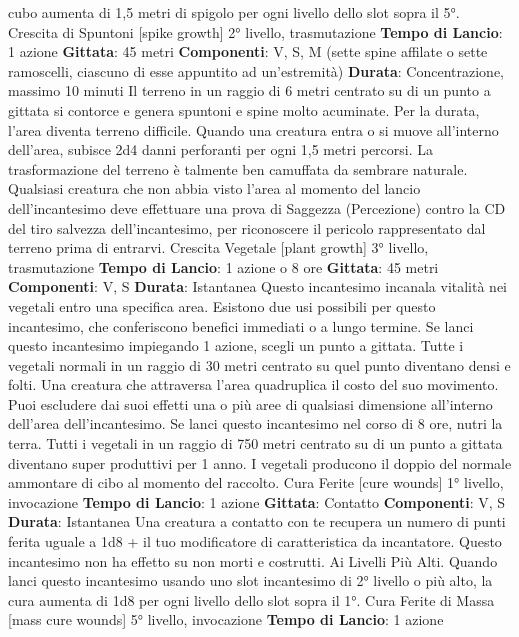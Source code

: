 \begin{multicols}{2}
cubo aumenta di 1,5 metri di spigolo per ogni livello
dello slot sopra il 5°.
Crescita di Spuntoni
[spike growth]
2° livello, trasmutazione
\textbf{Tempo di Lancio}: 1 azione
\textbf{Gittata}: 45 metri
\textbf{Componenti}: V, S, M (sette spine affilate o sette
ramoscelli, ciascuno di esse appuntito ad un’estremità)
\textbf{Durata}: Concentrazione, massimo 10 minuti
Il terreno in un raggio di 6 metri centrato su di un punto
a gittata si contorce e genera spuntoni e spine molto
acuminate. Per la durata, l’area diventa terreno difficile.
Quando una creatura entra o si muove all’interno
dell’area, subisce 2d4 danni perforanti per ogni 1,5
metri percorsi.
La trasformazione del terreno è talmente ben camuffata
da sembrare naturale. Qualsiasi creatura che non abbia
visto l’area al momento del lancio dell’incantesimo deve
effettuare una prova di Saggezza (Percezione) contro la
CD del tiro salvezza dell’incantesimo, per riconoscere il
pericolo rappresentato dal terreno prima di entrarvi.
Crescita Vegetale
[plant growth]
3° livello, trasmutazione
\textbf{Tempo di Lancio}: 1 azione o 8 ore
\textbf{Gittata}: 45 metri
\textbf{Componenti}: V, S
\textbf{Durata}: Istantanea
Questo incantesimo incanala vitalità nei vegetali entro
una specifica area. Esistono due usi possibili per
questo incantesimo, che conferiscono benefici
immediati o a lungo termine.
Se lanci questo incantesimo impiegando 1 azione,
scegli un punto a gittata. Tutte i vegetali normali in un 
raggio di 30 metri centrato su quel punto diventano
densi e folti. Una creatura che attraversa l’area
quadruplica il costo del suo movimento.
Puoi escludere dai suoi effetti una o più aree di
qualsiasi dimensione all’interno dell’area
dell’incantesimo.
Se lanci questo incantesimo nel corso di 8 ore, nutri la
terra. Tutti i vegetali in un raggio di 750 metri centrato
su di un punto a gittata diventano super produttivi per 1
anno. I vegetali producono il doppio del normale
ammontare di cibo al momento del raccolto.
Cura Ferite
[cure wounds]
1° livello, invocazione
\textbf{Tempo di Lancio}: 1 azione
\textbf{Gittata}: Contatto
\textbf{Componenti}: V, S
\textbf{Durata}: Istantanea
Una creatura a contatto con te recupera un numero di
punti ferita uguale a 1d8 + il tuo modificatore di
caratteristica da incantatore. Questo incantesimo non
ha effetto su non morti e costrutti.
Ai Livelli Più Alti. Quando lanci questo incantesimo
usando uno slot incantesimo di 2° livello o più alto, la
cura aumenta di 1d8 per ogni livello dello slot sopra il
1°.
Cura Ferite di Massa
[mass cure wounds]
5° livello, invocazione
\textbf{Tempo di Lancio}: 1 azione

\end{multicols}
